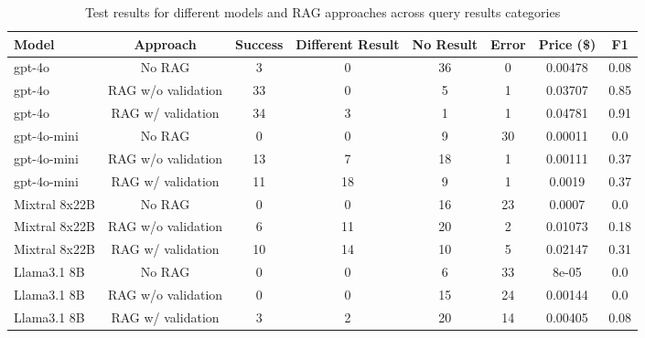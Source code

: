\documentclass[
]{ceurart}
\begin{document}
\begin{table}
  \captionsetup{format=plain}
  \caption{Test results for different models and RAG approaches across query results categories}
  \label{tab:model_comparison}
  \begin{tabular}{lccccccc}
    \toprule
    Model & Approach & Success & Different Result & No Result & Error & Price (\$)  & F1 \\
    \midrule
    gpt-4o & No RAG & 3 & 0 & 36 & 0 & 0.00478 & 0.08 \\
    gpt-4o & RAG w/o validation & 33 & 0 & 5 & 1 & 0.03707 & 0.85 \\
    gpt-4o & RAG w/ validation & 34 & 3 & 1 & 1 & 0.04781 & 0.91 \\
    \midrule
    gpt-4o-mini & No RAG & 0 & 0 & 9 & 30 & 0.00011 & 0.0 \\
    gpt-4o-mini & RAG w/o validation & 13 & 7 & 18 & 1 & 0.00111 & 0.37 \\
    gpt-4o-mini & RAG w/ validation & 11 & 18 & 9 & 1 & 0.0019 & 0.37 \\
    \midrule
    Mixtral 8x22B & No RAG & 0 & 0 & 16 & 23 & 0.0007 & 0.0 \\
    Mixtral 8x22B & RAG w/o validation & 6 & 11 & 20 & 2 & 0.01073 & 0.18 \\
    Mixtral 8x22B & RAG w/ validation & 10 & 14 & 10 & 5 & 0.02147 & 0.31 \\
    \midrule
    Llama3.1 8B & No RAG & 0 & 0 & 6 & 33 & 8e-05 & 0.0 \\
    Llama3.1 8B & RAG w/o validation & 0 & 0 & 15 & 24 & 0.00144 & 0.0 \\
    Llama3.1 8B & RAG w/ validation & 3 & 2 & 20 & 14 & 0.00405 & 0.08 \\
    \bottomrule
  \end{tabular}
\end{table}






\end{document}
